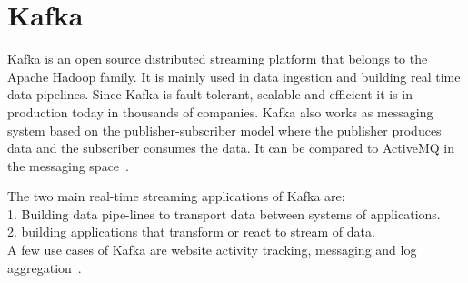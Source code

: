 \section{Kafka}

Kafka is an open source distributed streaming platform that belongs 
to the Apache Hadoop family. It is mainly used in data ingestion and 
building real time data pipelines. Since Kafka is fault tolerant, 
scalable and efficient it is in production today in thousands of 
companies. Kafka also works as messaging system based on the 
publisher-subscriber model where the publisher produces data and 
the subscriber consumes the data. It can be compared to ActiveMQ 
in the messaging space~\cite{hid-sp18-517-ApacheKafka}.


The two main real-time streaming applications of Kafka are: \\
1. Building data pipe-lines to transport data between systems of 
   applications.\\
2. building applications that transform or react to stream of data. \\

A few use cases of Kafka are website activity tracking, messaging 
and log aggregation~\cite{hid-sp18-517-ApacheKafka}.


